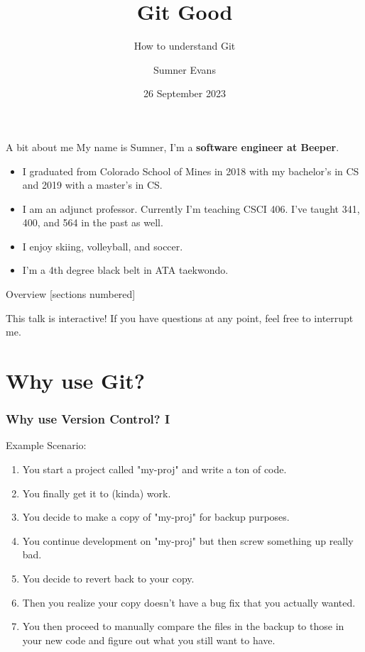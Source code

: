 \documentclass{beeper}
\title{Git Good}
\subtitle{How to understand Git}
\author{Sumner Evans}
\institute{Mines ACM}
\date{26 September 2023}
\begin{document}
\begin{frame}{A bit about me}
    My name is Sumner, I'm a \textbf{software engineer at Beeper}.
    \begin{itemize}
        \item I graduated from Colorado School of Mines in 2018 with my
            bachelor's in CS and 2019 with a master's in CS.
        \item I am an adjunct professor. Currently I'm teaching CSCI 406. I've
            taught 341, 400, and 564 in the past as well.
        \item I enjoy skiing, volleyball, and soccer.
        \item I'm a 4th degree black belt in ATA taekwondo.
    \end{itemize}
\end{frame}

\begin{frame}{Overview}
    [sections numbered]
    \tableofcontents[hideallsubsections]

    \begin{block}{This talk is interactive!}
        If you have questions at any point, feel free to interrupt me.
    \end{block}
\end{frame}

\section{Why use Git?}

\begin{frame}
    \frametitle{Why use Version Control? I}

    Example Scenario:

    \begin{enumerate}[<+->]
        \item You start a project called "my-proj" and write a ton of code.
        \item You finally get it to (kinda) work.
        \item You decide to make a copy of "my-proj" for backup purposes.
        \item You continue development on "my-proj" but then screw something up
            really bad.
        \item You decide to revert back to your copy.
        \item Then you realize your copy doesn't have a bug fix that you
            actually wanted.
        \item You then proceed to manually compare the files in the backup to
            those in your new code and figure out what you still want to have.
    \end{enumerate}

\end{frame}
\end{document}
